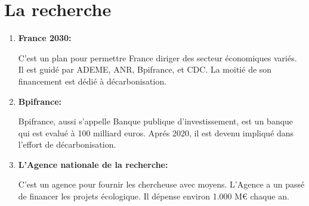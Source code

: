 \documentclass{article}
\begin{document}
\section{La recherche}

\begin{enumerate}
	\item \textbf{France 2030:}

        C'est un plan pour permettre France diriger des secteur économiques
        variés. Il est guidé par ADEME, ANR, Bpifrance, et CDC. La moitié de 
        son financement est dédié à décarbonisation.

	\item \textbf{Bpifrance:}

        Bpifrance, aussi s'appelle Banque publique d'investissement, est un
        banque qui est evalué à 100 milliard euros. Aprés 2020, il est devenu
        impliqué dans l'effort de décarbonisation.

	\item \textbf{L'Agence nationale de la recherche:}

        C'est un agence pour fournir les chercheuse avec moyens. L'Agence a un
        passé de financer les projets écologique. Il dépense environ 1.000 M€
        chaque an.

\end{enumerate}
\end{document}
